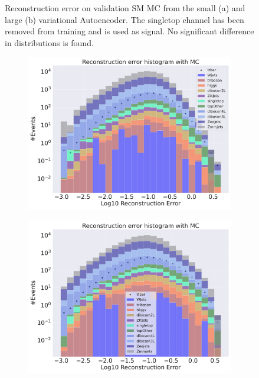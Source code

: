 \begin{figure}[H]
\begin{subfigure}{.45\textwidth}
        \caption{ }
        \label{fig:vae_big_singletop}
    \end{subfigure}
    \hfill 
    \caption[VAE | Reconstruction error using Singletop channel as signal]{Reconstruction error on validation SM MC from the small (a) and large (b) variational Autoencoder. The singletop channel has been removed from training and 
    is used as signal. No significant difference in distributions is found. }
    \label{fig:vae_big_channel_2}
\end{figure}

\begin{figure}[H]
    \centering
    \begin{subfigure}{.45\textwidth}
        \includegraphics[width=\textwidth]{Figures/VAE_testing/small/b_data_recon_big_rm3_feats_sig_ttbar.pdf}
        \caption{}
        \label{fig:vae_small_ttbar}
    \end{subfigure}
    \hfill 
    \begin{subfigure}{.45\textwidth}
        \includegraphics[width=\textwidth]{Figures/VAE_testing/big/b_data_recon_big_rm3_feats_sig_ttbar.pdf}

\end{subfigure}
\end{figure}
